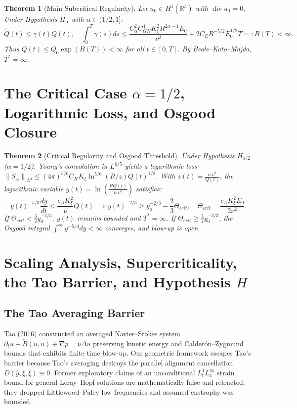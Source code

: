 \documentclass[11pt,reqno]{amsart}
\numberwithin{equation}{section}
\newtheorem{theorem}{Theorem}[section]
\theoremstyle{definition}
\newcommand{\R}{\mathbb{R}}
\newcommand{\norm}[1]{\left\lVert#1\right\rVert}
\begin{document}
\begin{theorem}[Main Subcritical Regularity]\label{thm:subcritical}
Let $u_0 \in H^1(\R^3)$ with $\operatorname{div} u_0 = 0$. Under Hypothesis $H_\alpha$ with $\alpha \in (1/2, 1]$:
\begin{equation}\label{eq:gronwall_ode}
\dot{Q}(t) \le \gamma(t) Q(t), \quad \int_0^T \gamma(s) ds \le \frac{C_\alpha^2 C_{GN}^4 K_\xi^2 R^{2\alpha - 1} E_0}{\nu^2} + 2 C_E R^{-5/2} E_0^{1/2} T =: B(T) < \infty.
\end{equation}
Thus $Q(t) \le Q_0 \exp(B(T)) < \infty$ for all $t \in [0, T]$. By Beale--Kato--Majda, $T^* = \infty$.
\end{theorem}

\section{The Critical Case $\alpha = 1/2$, Logarithmic Loss, and Osgood Closure}

\begin{theorem}[Critical Regularity and Osgood Threshold]\label{thm:critical}
Under Hypothesis $H_{1/2}$ ($\alpha = 1/2$), Young's convolution in $L^{6/5}$ yields a logarithmic loss $\norm{S_A}_{L^3} \le (4\pi)^{5/6} C_K K_\xi \ln^{5/6}(R/z) Q(t)^{1/2}$. With $z(t) = \frac{c_* \nu^2}{Q(t)}$, the logarithmic variable $y(t) = \ln\left( \frac{R Q(t)}{c_* \nu^2} \right)$ satisfies:
\begin{equation}\label{eq:osgood_ode}
y(t)^{-5/3} \frac{dy}{dt} \le \frac{c_A K_\xi^2}{\nu} Q(t) \implies y(t)^{-2/3} \ge y_0^{-2/3} - \frac{2}{3} \Theta_{crit}, \quad \Theta_{crit} = \frac{c_A K_\xi^2 E_0}{2\nu^2}.
\end{equation}
If $\Theta_{crit} < \frac{3}{2} y_0^{-2/3}$, $y(t)$ remains bounded and $T^* = \infty$.
If $\Theta_{crit} \ge \frac{3}{2} y_0^{-2/3}$, the Osgood integral $\int^\infty y^{-5/3} dy < \infty$ converges, and blow-up is open.
\end{theorem}

\section{Scaling Analysis, Supercriticality, the Tao Barrier, and Hypothesis $H$}\label{sec:tao_barrier}

\subsection*{The Tao Averaging Barrier}
Tao (2016) constructed an averaged Navier--Stokes system $\partial_t u + \widetilde{B}(u, u) + \nabla p = \nu \Delta u$ preserving kinetic energy and Calder\'on--Zygmund bounds that exhibits finite-time blow-up.
Our geometric framework escapes Tao's barrier because Tao's averaging destroys the parallel alignment cancellation $D(\hat{y}, \xi, \xi) \equiv 0$.
Former exploratory claims of an unconditional $L^1_t L^\infty_x$ strain bound for general Leray--Hopf solutions are mathematically false and retracted: they dropped Littlewood--Paley low frequencies and assumed enstrophy was bounded.
\end{document}
